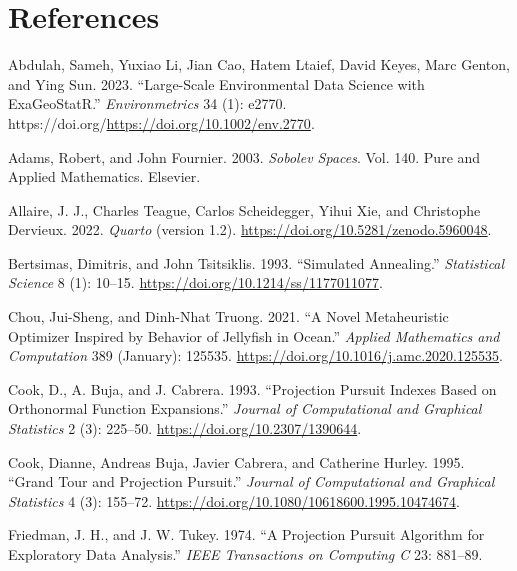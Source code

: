 \documentclass[
  12pt,
]{interact}
\newlength{\cslhangindent}
\newlength{\cslentryspacingunit} %
\newenvironment{CSLReferences}[2] %
 {%
  \setlength{\parindent}{0pt}
  \ifodd #1
  \let\oldpar\par
  \def\par{\hangindent=\cslhangindent\oldpar}
  \fi
  \setlength{\parskip}{#2\cslentryspacingunit}
 }%
 {}
\theoremstyle{plain}
\begin{document}
\hypertarget{references}{%
\section*{References}\label{references}}

\hypertarget{refs}{}
\begin{CSLReferences}{1}{0}
\leavevmode{}%
Abdulah, Sameh, Yuxiao Li, Jian Cao, Hatem Ltaief, David Keyes, Marc
Genton, and Ying Sun. 2023. {``Large-Scale Environmental Data Science
with {ExaGeoStatR}.''} \emph{Environmetrics} 34 (1): e2770.
https://doi.org/\url{https://doi.org/10.1002/env.2770}.

\leavevmode{}%
Adams, Robert, and John Fournier. 2003. \emph{Sobolev Spaces}. Vol. 140.
Pure and Applied Mathematics. Elsevier.

\leavevmode{}%
Allaire, J. J., Charles Teague, Carlos Scheidegger, Yihui Xie, and
Christophe Dervieux. 2022. \emph{{Quarto}} (version 1.2).
\url{https://doi.org/10.5281/zenodo.5960048}.

\leavevmode{}%
Bertsimas, Dimitris, and John Tsitsiklis. 1993. {``{Simulated
Annealing}.''} \emph{Statistical Science} 8 (1): 10--15.
\url{https://doi.org/10.1214/ss/1177011077}.

\leavevmode{}%
Chou, Jui-Sheng, and Dinh-Nhat Truong. 2021. {``A Novel Metaheuristic
Optimizer Inspired by Behavior of Jellyfish in Ocean.''} \emph{Applied
Mathematics and Computation} 389 (January): 125535.
\url{https://doi.org/10.1016/j.amc.2020.125535}.

\leavevmode{}%
Cook, D., A. Buja, and J. Cabrera. 1993. {``Projection Pursuit Indexes
Based on Orthonormal Function Expansions.''} \emph{Journal of
Computational and Graphical Statistics} 2 (3): 225--50.
\url{https://doi.org/10.2307/1390644}.

\leavevmode{}%
Cook, Dianne, Andreas Buja, Javier Cabrera, and Catherine Hurley. 1995.
{``Grand Tour and Projection Pursuit.''} \emph{Journal of Computational
and Graphical Statistics} 4 (3): 155--72.
\url{https://doi.org/10.1080/10618600.1995.10474674}.

\leavevmode{}%
Friedman, J. H., and J. W. Tukey. 1974. {``{A} {P}rojection {P}ursuit
{A}lgorithm for {E}xploratory {D}ata {A}nalysis.''} \emph{IEEE
Transactions on Computing C} 23: 881--89.


\end{CSLReferences}
\end{document}
